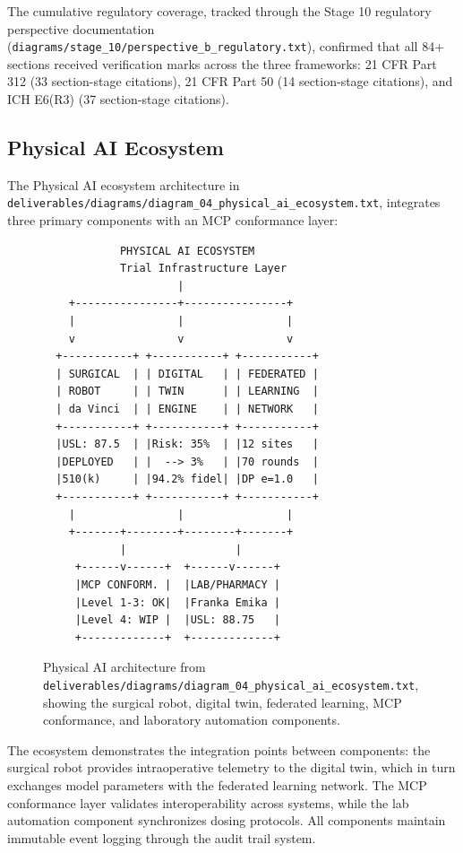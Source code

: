 The cumulative regulatory coverage, tracked through the Stage 10 regulatory perspective documentation (\texttt{diagrams/stage\_10/perspective\_b\_regulatory.txt}), confirmed that all 84+ sections received verification marks across the three frameworks: 21 CFR Part 312 (33 section-stage citations), 21 CFR Part 50 (14 section-stage citations), and ICH E6(R3) (37 section-stage citations).

\newpage

\subsection{Physical AI Ecosystem}

The Physical AI ecosystem architecture in \texttt{deliverables/diagrams/diagram\_04\_physical\_ai\_ecosystem.txt}, integrates three primary components with an MCP conformance layer:



\begin{figure}[H]
\begin{verbatim}
            PHYSICAL AI ECOSYSTEM
            Trial Infrastructure Layer
                     |
    +----------------+----------------+
    |                |                |
    v                v                v
  +-----------+ +-----------+ +-----------+
  | SURGICAL  | | DIGITAL   | | FEDERATED |
  | ROBOT     | | TWIN      | | LEARNING  |
  | da Vinci  | | ENGINE    | | NETWORK   |
  +-----------+ +-----------+ +-----------+
  |USL: 87.5  | |Risk: 35%  | |12 sites   |
  |DEPLOYED   | |  --> 3%   | |70 rounds  |
  |510(k)     | |94.2% fidel| |DP e=1.0   |
  +-----------+ +-----------+ +-----------+
    |                |                |
    +-------+--------+--------+-------+
            |                 |
     +------v------+  +------v------+
     |MCP CONFORM. |  |LAB/PHARMACY |
     |Level 1-3: OK|  |Franka Emika |
     |Level 4: WIP |  |USL: 88.75   |
     +-------------+  +-------------+
\end{verbatim}
\caption{Physical AI architecture from \texttt{deliverables/diagrams/diagram\_04\_physical\_ai\_ecosystem.txt}, showing the surgical robot, digital twin, federated learning, MCP conformance, and laboratory automation components.}
\label{fig:pai-ecosystem}
\end{figure}

The ecosystem demonstrates the integration points between components: the surgical robot provides intraoperative telemetry to the digital twin, which in turn exchanges model parameters with the federated learning network. The MCP conformance layer validates interoperability across systems, while the lab automation component synchronizes dosing protocols. All components maintain immutable event logging through the audit trail system.

